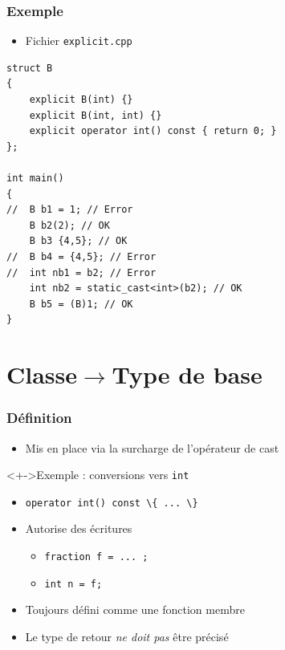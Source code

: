 \begin{frame}[containsverbatim]
\frametitle{Exemple}
\begin{itemize}
\item Fichier \texttt{explicit.cpp}
\end{itemize}
\begin{lstlisting}
struct B
{
    explicit B(int) {}
    explicit B(int, int) {}
    explicit operator int() const { return 0; }
};

int main()
{   
//  B b1 = 1; // Error
    B b2(2); // OK
    B b3 {4,5}; // OK
//  B b4 = {4,5}; // Error
//  int nb1 = b2; // Error
    int nb2 = static_cast<int>(b2); // OK
    B b5 = (B)1; // OK
}
\end{lstlisting}
\end{frame}

\section{Classe$\rightarrow$Type de base}

\begin{frame}
\frametitle{Définition}
\begin{itemize}[<+->]
\item Mis en place via la surcharge de l'opérateur de cast
\end{itemize}
\begin{exampleblock}<+->{Exemple : conversions vers \texttt{int}}
	\begin{itemize}[<+->]
	\item \lstinline|operator int() const \{ ... \}|
	\item Autorise des écritures 
		\begin{itemize}
		\item \lstinline|fraction f = ... ;|
		\item \lstinline|int n = f;|
		\end{itemize}
	\end{itemize}
\end{exampleblock}
\begin{itemize}[<+->]
\item Toujours défini comme une fonction membre
\item Le type de retour \emph{ne doit pas} être précisé
\end{itemize}
\end{frame}

